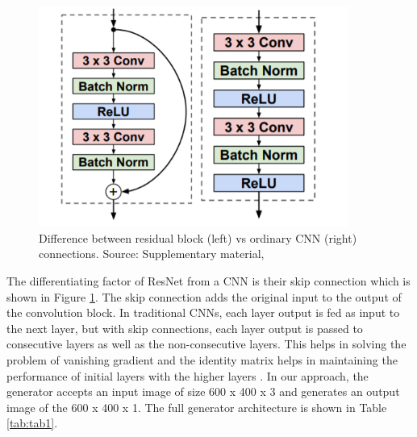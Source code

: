 \begin{figure}[H]
\centering
\includegraphics[width=4in]{images/resnetblock.PNG}
\caption[Difference between residual block (left) vs ordinary CNN (right) connections]{Difference between residual block (left) vs ordinary CNN (right) connections. Source: Supplementary material, \citep{johnson2016perceptual}}
\label{fig:resblock}
\end{figure}

The differentiating factor of ResNet from a CNN is their skip connection which is shown in Figure \ref{fig:resblock}. The skip connection adds the original input to the output of the convolution block. In traditional CNNs, each layer output is fed as input to the next layer, but with skip connections, each layer output is passed to consecutive layers as well as the non-consecutive layers. This helps in solving the problem of vanishing gradient and the identity matrix helps in maintaining the performance of initial layers with the higher layers \citep{resnet}. In our approach, the generator accepts an input image of size 600 x 400 x 3 and generates an output image of the 600 x 400 x 1. The full generator architecture is shown in Table \ref{tab:tab1}. \\

